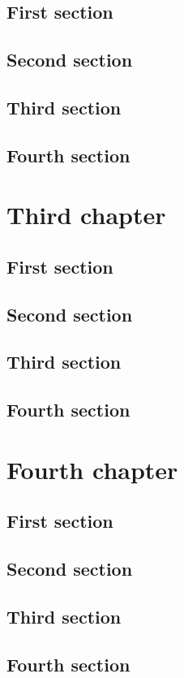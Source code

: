 \documentclass{researchbook}
\theoremstyle{plain}
\theoremstyle{definition}
\theoremstyle{remark}
\begin{document}
\section{First section}\lipsum
\section{Second section}\lipsum
\section{Third section}\lipsum
\section{Fourth section}\lipsum


\chapter{Third chapter}

\section{First section}\lipsum
\section{Second section}\lipsum
\section{Third section}\lipsum
\section{Fourth section}\lipsum


\chapter{Fourth chapter}

\section{First section}\lipsum
\section{Second section}\lipsum
\section{Third section}\lipsum
\section{Fourth section}\lipsum
\end{document}
